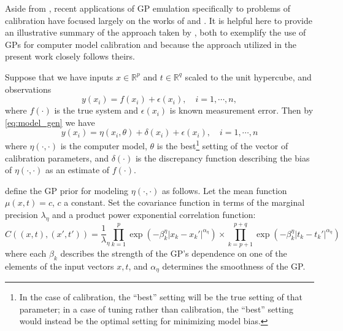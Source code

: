 \documentclass{article}
\begin{document}

Aside from \cite{Kennedy2001}, recent applications of GP emulation specifically to problems of calibration have focused largely on the works of \cite{Williams2006} and \cite{Bayarri2007}. It is helpful here to provide an illustrative summary of the approach taken by \cite{Williams2006}, both to exemplify the use of GPs for computer model calibration and because the approach utilized in the present work closely follows theirs.

Suppose that we have inputs $x\in \mathbb R^p$ and $t\in\mathbb R^q$ scaled to the unit hypercube, and observations 
\begin{equation}\label{eq:2}
y(x_i) = f(x_i) + \epsilon(x_i),\quad i=1,\cdots,n,
\end{equation}
where $f(\cdot)$ is the true system and $\epsilon(x_i)$ is known measurement error. Then by \eqref{eq:model_gen} we have
\begin{equation}\label{eq:2}
y(x_i) = \eta(x_i,\theta) + \delta(x_i) + \epsilon(x_i),\quad i=1,\cdots,n
\end{equation}
where $\eta(\cdot,\cdot)$ is the computer model, $\theta$ is the best\footnote{In the case of calibration, the ``best'' setting will be the true setting of that parameter; in a case of tuning rather than calibration, the ``best'' setting would instead be the optimal setting for minimizing model bias.}
setting of the vector of calibration parameters, and $\delta(\cdot)$ is the discrepancy function describing the bias of $\eta(\cdot,\cdot)$ as an estimate of $f(\cdot)$.

\citeauthor*{Williams2006} define the GP prior for modeling $\eta(\cdot,\cdot)$ as follows. Let the mean function $\mu(x,t)=c$, $c$ a constant. Set the covariance function in terms of the marginal precision $\lambda_\eta$ and a product power exponential correlation function:
\begin{equation}\label{eq:Hig_cov}
C((x,t),(x',t')) = \frac 1\lambda_\eta \prod_{k=1}^{p}
\exp \left(-\beta^\eta_k|x_k-x_k'|^{\alpha_\eta}\right) \times
\prod_{k=p+1}^{p+q}
\exp \left(-\beta^\eta_{k}|t_k-t_k'|^{\alpha_\eta}\right)
\end{equation}
where each $\beta_k$ describes the strength of the GP's dependence on one of the elements of the input vectors $x,t$, and $\alpha_\eta$ determines the smoothness of the GP. 
\end{document}
